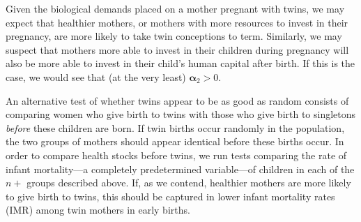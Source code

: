 \documentclass[subeqn]{article}
\begin{document}
\begin{spacing}{1.4}
Given the biological demands placed on a mother pregnant with twins, we may 
expect that healthier mothers, or mothers with more resources to invest in their
pregnancy, are more likely to take twin conceptions to term.  Similarly, we may
suspect that mothers more able to invest in their children during pregnancy will 
also be more able to invest in their child's human capital after birth.  If this 
is the case, we would see that (at the very least) $\bm{\alpha}_2>0$.  

An alternative test of whether twins appear to be as good as random consists of 
comparing women who give birth to twins with those who give birth to singletons 
\emph{before} these children are born.  If twin births occur randomly in the 
population, the two groups of mothers should appear identical before these births 
occur. In order to compare health stocks before twins, we run tests comparing the 
rate of infant mortality---a completely predetermined variable---of children in 
each of the $n+$ groups described above.  If, as we contend, healthier mothers 
are more likely to give birth to twins, this should be captured in lower infant 
mortality rates (IMR) among twin mothers in early births.


\end{spacing}
\end{document}

